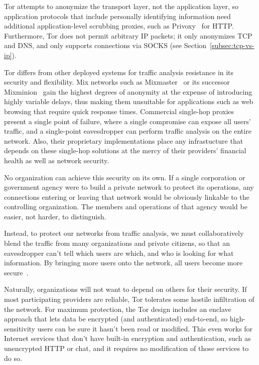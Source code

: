 \documentclass{llncs}
\begin{document}
Tor attempts to anonymize the transport layer, not the application layer, so
application protocols that include personally identifying information need
additional application-level scrubbing proxies, such as
Privoxy~\cite{privoxy} for HTTP.  Furthermore, Tor does not permit arbitrary
IP packets; it only anonymizes TCP and DNS, and only supports connections via
SOCKS (see Section~\ref{subsec:tcp-vs-ip}).

Tor differs from other deployed systems for traffic analysis resistance
in its security and flexibility.  Mix networks such as
Mixmaster~\cite{mixmaster-spec} or its successor Mixminion~\cite{minion-design}
gain the highest degrees of anonymity at the expense of introducing highly
variable delays, thus making them unsuitable for applications such as web
browsing that require quick response times.  Commercial single-hop
proxies~\cite{anonymizer} present a single point of failure, where
a single compromise can expose all users' traffic, and a single-point
eavesdropper can perform traffic analysis on the entire network.
Also, their proprietary implementations place any infrastucture that
depends on these single-hop solutions at the mercy of their providers'
financial health as well as network security.

No organization can achieve this security on its own.  If a single
corporation or government agency were to build a private network to
protect its operations, any connections entering or leaving that network
would be obviously linkable to the controlling organization.  The members
and operations of that agency would be easier, not harder, to distinguish.

Instead, to protect our networks from traffic analysis, we must
collaboratively blend the traffic from many organizations and private
citizens, so that an eavesdropper can't tell which users are which,
and who is looking for what information.  By bringing more users onto
the network, all users become more secure~\cite{econymics}.

Naturally, organizations will not want to depend on others for their
security.  If most participating providers are reliable, Tor tolerates
some hostile infiltration of the network.  For maximum protection,
the Tor design includes an enclave approach that lets data be encrypted
(and authenticated) end-to-end, so high-sensitivity users can be sure it
hasn't been read or modified.  This even works for Internet services that
don't have built-in encryption and authentication, such as unencrypted
HTTP or chat, and it requires no modification of those services to do so.
\end{document}
